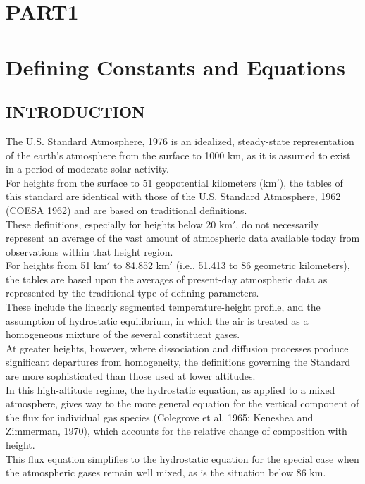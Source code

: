 \documentclass{article}
\begin{document}
\begin{center}
  \section*{PART1}
  \section*{Defining Constants and Equations}
\end{center}
\setcounter{section}{1}
\setcounter{subsection}{-1}
\subsection{INTRODUCTION}
The U.S. Standard Atmosphere, 1976 is an idealized, steady-state representation of the earth’s atmosphere from the surface to 1000 km, as it is assumed to exist in a period of moderate solar activity.\\

For heights from the surface to 51 geopotential kilometers (km$'$), the tables of this standard are identical with those of the U.S. Standard Atmosphere, 1962 (COESA 1962) and are based on traditional definitions.\\
These definitions, especially for heights below 20 km$'$, do not necessarily represent an average of the vast amount of atmospheric data available today from observations within that height region.\\

For heights from 51 km$'$ to 84.852 km$'$ (i.e., 51.413 to 86 geometric kilometers), the tables are based upon the averages of present-day atmospheric data as represented by the traditional type of defining parameters.\\
These include the linearly segmented temperature-height profile, and the assumption of hydrostatic equilibrium, in which the air is treated as a homogeneous mixture of the several constituent gases.\\

At greater heights, however, where dissociation and diffusion processes produce significant departures from homogeneity, the definitions governing the Standard are more sophisticated than those used at lower altitudes.\\

In this high-altitude regime, the hydrostatic equation, as applied to a mixed atmosphere, gives way to the more general equation for the vertical component of the flux for individual gas species (Colegrove et al. 1965; Keneshea and Zimmerman, 1970), which accounts for the relative change of composition with height.\\
This flux equation simplifies to the hydrostatic equation for the special case when the atmospheric gases remain well mixed, as is the situation below 86 km.\\
\end{document}
